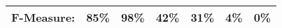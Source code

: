 \begin{table}
{\begin{tabular}{l|ll|ll|ll}
{\bf F-Measure:}                & \multicolumn{1}{l}{\bf 85\%} & \multicolumn{1}{l|}{\bf  98\%} & \multicolumn{1}{l}{\bf  42\%} & 
\multicolumn{1}{l|}{\bf 31\%} & \multicolumn{1}{l}{\bf 4\%} & \multicolumn{1}{l}{\bf 0\%}  \\ 
\hline
\hline

\end{tabular}
}
\vspace{-0.5cm}
\end{table}

